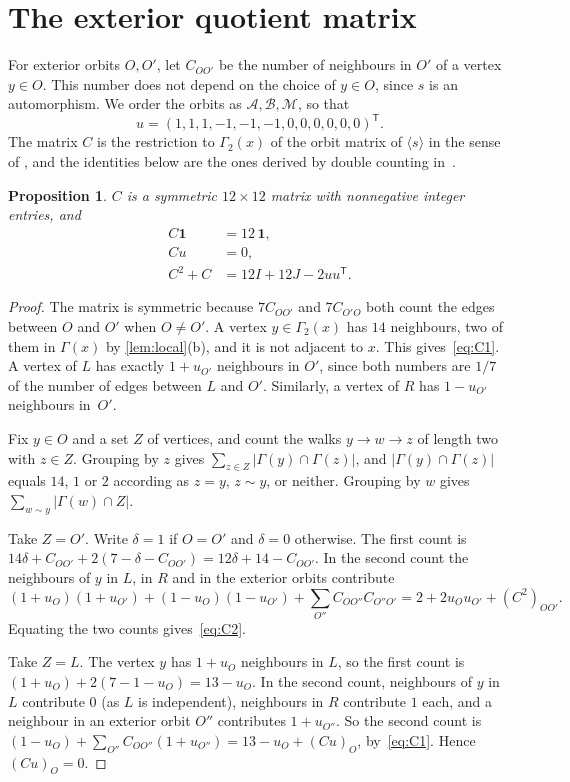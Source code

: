 \documentclass[11pt,a4paper]{amsart}
\newtheorem{proposition}[theorem]{Proposition}
\theoremstyle{definition}
\theoremstyle{remark}
\newcommand{\one}{\mathbf{1}}
\newcommand{\cA}{\mathcal{A}}
\newcommand{\cB}{\mathcal{B}}
\newcommand{\cM}{\mathcal{M}}
\newcommand{\T}{\mathsf{T}}
\begin{document}
\section{The exterior quotient matrix}\label{sec:quotient}

For exterior orbits $O,O'$, let $C_{OO'}$ be the number of neighbours in $O'$ of a vertex $y\in O$. This
number does not depend on the choice of $y\in O$, since $s$ is an automorphism. We order the orbits as
$\cA,\cB,\cM$, so that
\[
u=(1,1,1,-1,-1,-1,0,0,0,0,0,0)^{\T}.
\]
The matrix $C$ is the restriction to $\Gamma_2(x)$ of the orbit matrix of $\langle s\rangle$ in the sense of
\cite{B09,BL11}, and the identities below are the ones derived by double counting in~\cite[\S4]{CW25}.

\begin{proposition}\label{prop:C}
$C$ is a symmetric $12\times12$ matrix with nonnegative integer entries, and
\begin{align}
C\one&=12\,\one,\label{eq:C1}\\
Cu&=0,\label{eq:Cu}\\
C^2+C&=12I+12J-2uu^{\T}.\label{eq:C2}
\end{align}
\end{proposition}

\begin{proof}
The matrix is symmetric because $7C_{OO'}$ and $7C_{O'O}$ both count the edges between $O$ and $O'$ when
$O\neq O'$. A vertex $y\in\Gamma_2(x)$ has $14$ neighbours, two of them in $\Gamma(x)$ by
\cref{lem:local}(b), and it is not adjacent to $x$. This gives~\eqref{eq:C1}. A vertex of $L$ has exactly
$1+u_{O'}$ neighbours in $O'$, since both numbers are $1/7$ of the number of edges between $L$ and $O'$.
Similarly, a vertex of $R$ has $1-u_{O'}$ neighbours in~$O'$.

Fix $y\in O$ and a set $Z$ of vertices, and count the walks $y\to w\to z$ of length two with $z\in Z$. Grouping
by $z$ gives $\sum_{z\in Z}|\Gamma(y)\cap\Gamma(z)|$, and $|\Gamma(y)\cap\Gamma(z)|$ equals $14$, $1$ or $2$
according as $z=y$, $z\sim y$, or neither. Grouping by $w$ gives $\sum_{w\sim y}|\Gamma(w)\cap Z|$.

Take $Z=O'$. Write $\delta=1$ if $O=O'$ and $\delta=0$ otherwise. The first count is
$14\delta+C_{OO'}+2(7-\delta-C_{OO'})=12\delta+14-C_{OO'}$. In the second count the neighbours of $y$ in $L$,
in $R$ and in the exterior orbits contribute
\[
(1+u_O)(1+u_{O'})+(1-u_O)(1-u_{O'})+\sum_{O''}C_{OO''}C_{O''O'}=2+2u_Ou_{O'}+(C^2)_{OO'}.
\]
Equating the two counts gives~\eqref{eq:C2}.

Take $Z=L$. The vertex $y$ has $1+u_O$ neighbours in $L$, so the first count is $(1+u_O)+2(7-1-u_O)=13-u_O$.
In the second count, neighbours of $y$ in $L$ contribute $0$ (as $L$ is independent), neighbours in $R$
contribute $1$ each, and a neighbour in an exterior orbit $O''$ contributes $1+u_{O''}$. So the second count
is $(1-u_O)+\sum_{O''}C_{OO''}(1+u_{O''})=13-u_O+(Cu)_O$, by~\eqref{eq:C1}. Hence $(Cu)_O=0$.
\end{proof}
\end{document}
